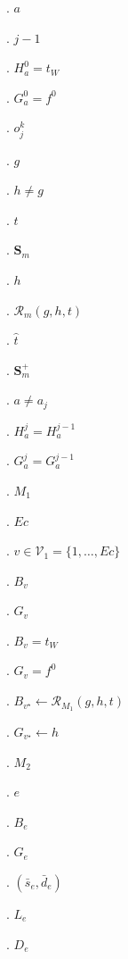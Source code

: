 \documentclass[a4paper,11pt]{article}
\begin{document}
. \(a\)\par\smallskip
{}. \(j-1\)\par\smallskip
{}. \(H_a^0=t_W\)\par\smallskip
{}. \(G_a^0=f^0\)\par\smallskip
{}. \(o_j^k\)\par\smallskip
{}. \(g\)\par\smallskip
{}. \(h\neq g\)\par\smallskip
{}. \(t\)\par\smallskip
{}. \(\mathbf S_m\)\par\smallskip
{}. \(h\)\par\smallskip
{}. \(\mathcal R_m(g,h,t)\)\par\smallskip
{}. \(\widehat t\)\par\smallskip
{}. \(\mathbf S_m^+\)\par\smallskip
{}. \(a\neq a_j\)\par\smallskip
{}. \(H_a^j=H_a^{j-1}\)\par\smallskip
{}. \(G_a^j=G_a^{j-1}\)\par\smallskip
{}. \(M_1\)\par\smallskip
{}. \(Ec\)\par\smallskip
{}. \(v\in\mathcal V_1=\{1,\ldots,Ec\}\)\par\smallskip
{}. \(B_v\)\par\smallskip
{}. \(G_v\)\par\smallskip
{}. \(B_v=t_W\)\par\smallskip
{}. \(G_v=f^0\)\par\smallskip
{}. \(B_{v^\star}\leftarrow\mathcal R_{M_1}(g,h,t)\)\par\smallskip
{}. \(G_{v^\star}\leftarrow h\)\par\smallskip
{}. \(M_2\)\par\smallskip
{}. \(e\)\par\smallskip
{}. \(B_e\)\par\smallskip
{}. \(G_e\)\par\smallskip
{}. \((\bar s_e,\bar d_e)\)\par\smallskip
{}. \(L_e\)\par\smallskip
{}. \(D_e\)\par\smallskip
\end{document}
